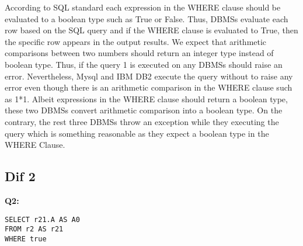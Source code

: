 According to SQL standard each expression in the WHERE clause should be evaluated to a boolean type such as True or False. Thus, DBMSs evaluate each row based on the SQL query and if the WHERE clause is evaluated to True, then the specific row appears in the output results. We expect that arithmetic comparisons between two numbers should return an integer type instead of boolean type. Thus, if the query 1 is executed on any DBMSs should raise an error. Nevertheless, Mysql and IBM DB2 execute the query without to raise any error even though there is an arithmetic comparison  in the WHERE clause such as 1*1. Albeit expressions in the WHERE clause should return a boolean type, these two DBMSs convert arithmetic comparison into a boolean type. On the contrary, the rest three DBMSs throw an exception while they executing the query which is something reasonable as they expect a boolean type in the WHERE Clause. 

\subsection{Dif 2}
  
\textbf{Q2:}
\begin{mdframed}[backgroundcolor=lightgray!20] 
\begin{lstlisting}[style=SQL]
SELECT r21.A AS A0 
FROM r2 AS r21
WHERE true
\end{lstlisting}
\end{mdframed}
 
